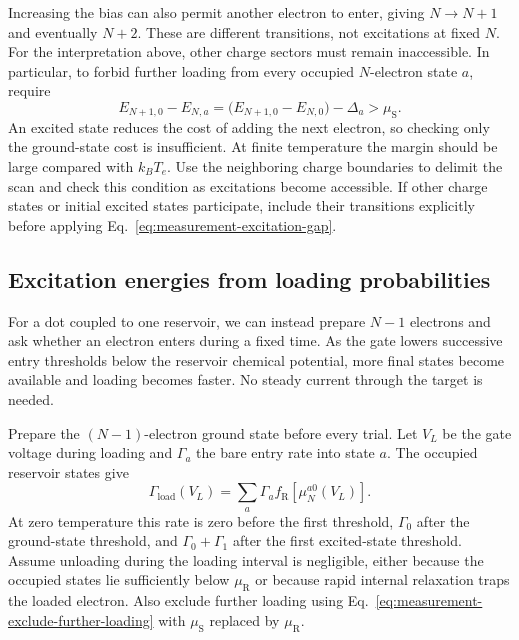Increasing the bias can also permit another electron to enter,
giving $N\to N+1$ and eventually $N+2$. These are different
transitions, not excitations at fixed $N$. For the interpretation
above, other charge sectors must remain inaccessible. In particular,
to forbid further loading from every occupied $N$-electron state
$a$, require
\begin{equation}
 E_{N+1,0}-E_{N,a}
   =\bigl(E_{N+1,0}-E_{N,0}\bigr)-\Delta_a
   >\mu_{\mathrm S}.
 \label{eq:measurement-exclude-further-loading}
\end{equation}
An excited state reduces the cost of adding the next electron, so
checking only the ground-state cost is insufficient. At finite
temperature the margin should be large compared with $k_BT_e$.
Use the neighboring charge boundaries to delimit the scan and
check this condition as excitations become accessible. If other
charge states or initial excited states participate, include their
transitions explicitly before applying
Eq.~\eqref{eq:measurement-excitation-gap}.

\subsection{Excitation energies from loading probabilities}
\label{sec:measurement-excitation-loading}
For a dot coupled to one reservoir, we can instead prepare $N-1$
electrons and ask whether an electron enters during a fixed time.
As the gate lowers successive entry thresholds below the reservoir
chemical potential, more final states become available and loading
becomes faster. No steady current through the target is needed.

Prepare the $(N-1)$-electron ground state before every trial. Let
$V_L$ be the gate voltage during loading and $\Gamma_a$ the bare
entry rate into state $a$. The occupied reservoir states give
\begin{equation}
 \Gamma_{\mathrm{load}}(V_L)
    =\sum_a\Gamma_a f_{\mathrm R}[\mu_N^{a0}(V_L)].
 \label{eq:measurement-loading-rate-spectrum}
\end{equation}
At zero temperature this rate is zero before the first threshold,
$\Gamma_0$ after the ground-state threshold, and
$\Gamma_0+\Gamma_1$ after the first excited-state threshold.
Assume unloading during the loading interval is negligible, either
because the occupied states lie sufficiently below $\mu_{\mathrm R}$
or because rapid internal relaxation traps the loaded electron.
Also exclude further loading using
Eq.~\eqref{eq:measurement-exclude-further-loading} with
$\mu_{\mathrm S}$ replaced by $\mu_{\mathrm R}$.

